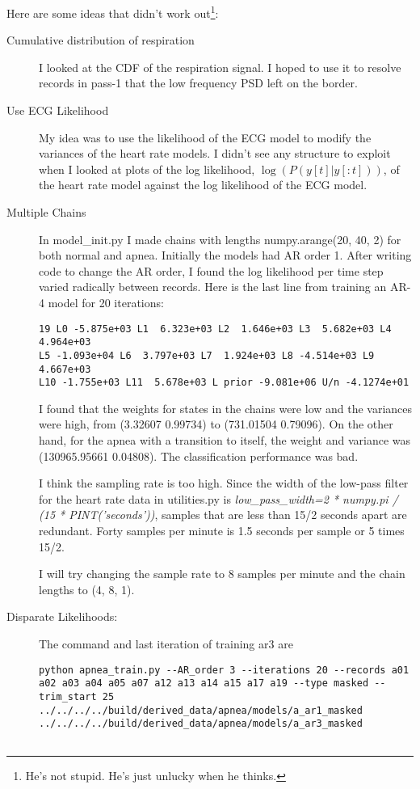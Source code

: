 \documentclass[12pt]{article}
\begin{document}
Here are some ideas that didn't work out\footnote{He's not stupid.
  He's just unlucky when he thinks.}:
\begin{description}
\item[Cumulative distribution of respiration] I looked at the CDF of
  the respiration signal.  I hoped to use it to resolve records in
  pass-1 that the low frequency PSD left on the border.
\item[Use ECG Likelihood] My idea was to use the likelihood of the ECG
  model to modify the variances of the heart rate models.  I didn't
  see any structure to exploit when I looked at plots of the log
  likelihood, $\log\left(P(y[t]|y[:t]) \right)$, of the heart rate
  model against the log likelihood of the ECG model.
\item[Multiple Chains] In model\_init.py I made chains with lengths
  numpy.arange(20, 40, 2) for both normal and apnea.  Initially the
  models had AR order 1.  After writing code to change the AR order, I
  found the log likelihood per time step varied radically between
  records.  Here is the last line from training an AR-4 model for 20
  iterations:
\begin{verbatim}
19 L0 -5.875e+03 L1  6.323e+03 L2  1.646e+03 L3  5.682e+03 L4  4.964e+03
L5 -1.093e+04 L6  3.797e+03 L7  1.924e+03 L8 -4.514e+03 L9  4.667e+03
L10 -1.755e+03 L11  5.678e+03 L prior -9.081e+06 U/n -4.1274e+01
\end{verbatim}
  I found that the weights for states in the chains were low and the
  variances were high, from (3.32607 0.99734) to (731.01504 0.79096).
  On the other hand, for the apnea with a transition to itself, the
  weight and variance was (130965.95661 0.04808).  The classification
  performance was bad.

  I think the sampling rate is too high.  Since the width of the
  low-pass filter for the heart rate data in utilities.py is
  \emph{low\_pass\_width=2 * numpy.pi / (15 * PINT('seconds'))},
  samples that are less than 15/2 seconds apart are redundant.  Forty
  samples per minute is 1.5 seconds per sample or 5 times 15/2.

  I will try changing the sample rate to 8 samples per minute and the
  chain lengths to (4, 8, 1).
\item[Disparate Likelihoods:] The command and last iteration of
  training ar3 are
\begin{verbatim}
python apnea_train.py --AR_order 3 --iterations 20 --records a01 a02 a03 a04 a05 a07 a12 a13 a14 a15 a17 a19 --type masked --trim_start 25 ../../../../build/derived_data/apnea/models/a_ar1_masked ../../../../build/derived_data/apnea/models/a_ar3_masked


\end{verbatim}
\end{description}
\end{document}

